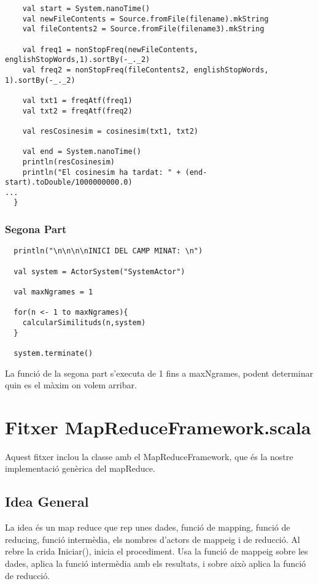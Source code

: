 \documentclass[11pt,a4paper,twoside]{report}
\begin{document}
\begin{lstlisting}
    val start = System.nanoTime()
    val newFileContents = Source.fromFile(filename).mkString
    val fileContents2 = Source.fromFile(filename3).mkString

    val freq1 = nonStopFreq(newFileContents, englishStopWords,1).sortBy(-_._2)
    val freq2 = nonStopFreq(fileContents2, englishStopWords, 1).sortBy(-_._2)

    val txt1 = freqAtf(freq1)
    val txt2 = freqAtf(freq2)

    val resCosinesim = cosinesim(txt1, txt2)

    val end = System.nanoTime()
    println(resCosinesim)
    println("El cosinesim ha tardat: " + (end-start).toDouble/1000000000.0)
...
  }
\end{lstlisting}

\subsubsection{Segona Part}

\begin{lstlisting}
  println("\n\n\n\nINICI DEL CAMP MINAT: \n")

  val system = ActorSystem("SystemActor")

  val maxNgrames = 1

  for(n <- 1 to maxNgrames){
    calcularSimilituds(n,system)
  }

  system.terminate()
\end{lstlisting}

La funció de la segona part s'executa de 1 fins a maxNgrames, podent determinar quin es el màxim on volem arribar.


\section{Fitxer MapReduceFramework.scala}

Aquest fitxer inclou la classe amb el MapReduceFramework, que és la nostre implementació genèrica del mapReduce.

\subsection{Idea General}
La idea és un map reduce que rep unes dades, funció de mapping, funció de reducing, funció intermèdia, els nombres d'actors de mappeig i de reducció.
Al rebre la crida Iniciar(), inicia el procediment. Usa la funció de mappeig sobre les dades, aplica la funció intermèdia amb els resultats, i sobre això aplica la funció de reducció.
\end{document}
